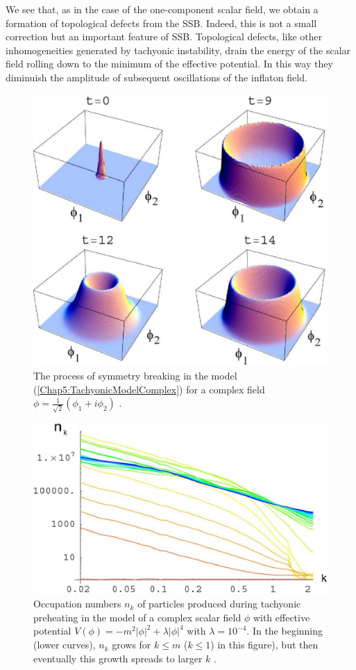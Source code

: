 \documentclass[11pt,a4paper,twoside]{book}
\begin{document}
We see that, as in the case of the one-component scalar field, we obtain a formation of topological defects from the SSB. Indeed, this is not a small correction but an important feature of SSB. Topological defects, like other inhomogeneities generated by tachyonic instability, drain the energy of the scalar field rolling down to the minimum of the effective potential. In this way they diminuish the amplitude of subsequent oscillations of the inflaton field.
\begin{figure}
	\centering
	\includegraphics[width=0.6\linewidth, height=0.4\textheight]{Images/Chap5/TachyonicInstability_Fig7}
	\caption{The process of symmetry breaking in the model (\ref{Chap5:TachyonicModelComplex}) for a complex field $ \phi=\frac{1}{\sqrt{2}}(\phi_{1} + i\phi_{2}) $ \cite{Chap5:TachyonicInstability}.}
	\label{fig:tachyonicinstabilityfig7}
\end{figure}
\begin{figure}
	\centering
	\includegraphics[width=0.5\linewidth, height=0.25\textheight]{Images/Chap5/TachyonicInstability_Fig8}
	\caption{Occupation numbers $ n_{k} $ of particles produced during tachyonic preheating in the model of a complex scalar field $\phi$ with effective potential $ V(\phi)=-m^{2}|\phi|^{2} + \lambda|\phi|^{4} $ with $\lambda = 10^{-4}$. In the beginning  (lower curves), $ n_{k} $ grows for $ k\le m $ ($ k\le 1 $) in this figure), but then eventually this growth spreads to larger $ k $ \cite{Chap5:TachyonicInstability}.}
	\label{fig:tachyonicinstabilityfig8}
\end{figure}
\end{document}
